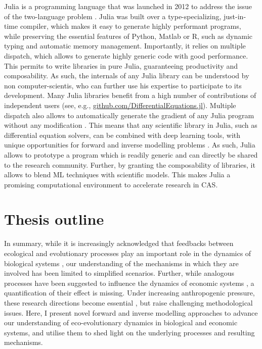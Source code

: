 Julia is a programming language that was launched in 2012 to address the issue of the two-language problem \citep{Bezanson2017,Bezanson2018}. Julia was built over a type-specializing, just-in-time compiler, which makes it easy to generate highly performant programs, while preserving the essential features of Python, Matlab or R, such as dynamic typing and automatic memory management.
% 
Importantly, it relies on multiple dispatch, which allows to generate highly generic code with good performance. This permits to write libraries in pure Julia, guaranteeing productivity and composability.
% 
% 
As such, the internals of any Julia library can be understood by non computer-scientis, who can further use his expertise to participate to its development. Many Julia libraries benefit from a high number of contributions of independent users (see, e.g., \href{github.com/DifferentialEquations.jl}{github.com/DifferentialEquations.jl}).
% 
Multiple dispatch also allows to automatically generate the gradient of any Julia program without any modification \citep{ForwardDiff.jl, Zygote.jl}. This means that any scientific library in Julia, such as differential equation solvers, can be combined with deep learning tools, with unique opportunities for forward and inverse modelling problems \citep{Frank2022}. 
% 
% 
As such, Julia allows to prototype a program which is readily generic and can directly be shared to the research community. Further, by granting the composability of libraries, it allows to blend ML techniques with scientific models. This makes Julia a promising computational environment to accelerate research in CAS. 

\section{Thesis outline}

In summary, while it is increasingly acknowledged that feedbacks between ecological and evolutionary processes play an important role in the dynamics of biological systems \citep{Pelletier2009, Urban2016}, our understanding of the mechanisms in which they are involved has been limited to simplified scenarios.
% 
Further, while analogous processes have been suggested to influence the dynamics of economic systems \citep{Hodgson2019}, a quantification of their effect is missing.
%
Under increasing anthropogenic pressure, these research directions become essential \citep{Urban2016}, but raise challenging methodological issues.
% 
Here, I present novel forward and inverse modelling approaches to advance our understanding of eco-evolutionary dynamics in biological and economic systems, and utilise them to shed light on the underlying processes and resulting mechanisms.


